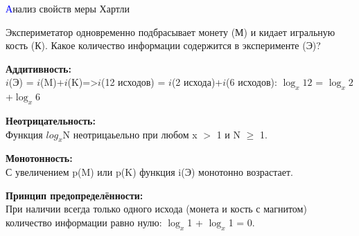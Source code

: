 \begin{frame}[t]{\large \textcolor{blue}{А}нализ свойств меры Хартли}
	\begin{spacing}{0.5}
		\small
		\noindent Экспериметатор одновременно подбрасывает монету (М) и кидает игральную кость (К). Какое количество информации содержится в эксперименте (Э)?
		
		\vspace{0.6cm}
		
		\noindent \color[rgb]{0,0.7,0.4} \textbf{Аддитивность:} \color{black} \\
		\vspace{1.5mm}
		$i$(Э) = $i$(M)+$i$(K)=>$i$(12 исходов) = $i$(2 исхода)+$i$(6 исходов): $\log_x{12}$ = $\log_x{2}$+$\log_x{6}$ %
		\vspace{2mm}
		
		\noindent \color[rgb]{0,0.7,0.4} \textbf{Неотрицательность:} \color{black} \\
		\vspace{1.5mm}
		Функция $log_x$N неотрицаьельно при любом x $>$ 1 и N $\geq$ 1.
		\vspace{2mm}
		
		\noindent \color[rgb]{0,0.7,0.4} \textbf{Монотонность:} \color{black} \\
		\vspace{1.5mm}
		С увеличением p(M) или p(K) функция i(Э) монотонно возрастает.
		\vspace{2mm}
		
		\noindent \color[rgb]{0,0.7,0.4} \textbf{Принцип предопределённости:} \color{black} \\
		\vspace{1.5mm}
		При наличии всегда только одного исхода (монета и кость с магнитом) количество информации равно нулю: $\log_x$1 + $\log_x$1 = 0.
		
	\end{spacing}	
\end{frame}